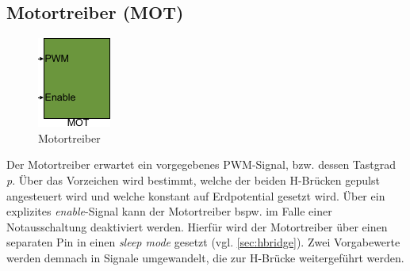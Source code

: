 \subsection{Motortreiber (MOT)} \label{subsec:MOT}

\begin{figure}[H]%
\centering
\includegraphics[width=0.2\columnwidth]{./Bilder/fig_mot}%
\caption{Motortreiber}%
\label{fig_mot}%
\end{figure}

Der Motortreiber erwartet ein vorgegebenes PWM-Signal, bzw. dessen Tastgrad \textit{p}. Über das Vorzeichen wird bestimmt, welche der beiden H-Brücken gepulst angesteuert wird und welche konstant auf Erdpotential gesetzt wird. Über ein explizites \textit{enable}-Signal kann der Motortreiber bspw. im Falle einer Notausschaltung deaktiviert werden. Hierfür wird der Motortreiber über einen separaten Pin in einen \textit{sleep mode} gesetzt (vgl. \autoref{sec:hbridge}). Zwei Vorgabewerte werden demnach in Signale umgewandelt, die zur H-Brücke weitergeführt werden.


